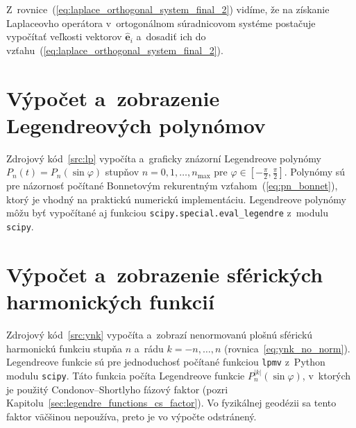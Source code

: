 \documentclass[a4paper, 12pt]{book}
\let\vec\mathbf
\begin{document}
Z~rovnice~(\ref{eq:laplace_orthogonal_system_final_2}) vidíme, že na získanie 
Laplaceovho operátora v~ortogonálnom súradnicovom systéme postačuje vypočítať 
veľkosti vektorov $\hat{\vec e}_i$ a~dosadiť ich do 
vzťahu~(\ref{eq:laplace_orthogonal_system_final_2}).




\chapter{Výpočet a~zobrazenie Legendreových polynómov}
\label{app:lp}

Zdrojový kód~\ref{src:lp} vypočíta a~graficky znázorní Legendreove polynómy 
$P_n(t) = P_n(\sin\varphi)$ stupňov $n = 0, 1, \dots, n_{\max}$ pre $\varphi 
\in [-\frac{\pi}{2}, \frac{\pi}{2}]$.  Polynómy sú pre názornosť počítané 
Bonnetovým rekurentným vzťahom~(\ref{eq:pn_bonnet}), ktorý je vhodný na 
praktickú numerickú implementáciu.  Legendreove polynómy môžu byť vypočítané aj 
funkciou \texttt{scipy.special.eval\_legendre} z~modulu \texttt{scipy}.








\chapter{Výpočet a~zobrazenie sférických harmonických funkcií}
\label{app:sh}

Zdrojový kód~\ref{src:ynk} vypočíta a~zobrazí nenormovanú plošnú sférickú
harmonickú funkciu stupňa $n$ a~rádu $k = -n, \dots, n$
(rovnica~\ref{eq:ynk_no_norm}).  Legendreove funkcie sú pre jednoduchosť
počítané funkciou \texttt{lpmv} z~Python modulu \texttt{scipy}.  Táto funkcia
počíta Legendreove funkcie $P_n^{|k|}(\sin\varphi)$, v~ktorých je
použitý Condonov--Shortlyho fázový faktor (pozri 
Kapitolu~\ref{sec:legendre_functions_cs_factor}).  Vo fyzikálnej geodézii sa 
tento faktor väčšinou nepoužíva, preto je vo výpočte odstránený.



\end{document}
